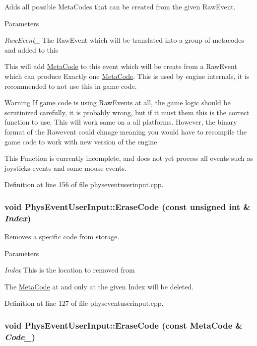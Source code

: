 Adds all possible MetaCodes that can be created from the given RawEvent. 
\begin{DoxyParams}{Parameters}
\item[{\em RawEvent\_\-}]The RawEvent which will be translated into a group of metacodes and added to this\end{DoxyParams}
This will add \hyperlink{classMetaCode}{MetaCode} to this event which will be create from a RawEvent which can produce Exactly one \hyperlink{classMetaCode}{MetaCode}. This is used by engine internals, it is recommended to not use this in game code. \begin{DoxyWarning}{Warning}
If game code is using RawEvents at all, the game logic should be scrutinized carefully, it is probably wrong, but if it must them this is the correct function to use. This will work same on a all platforms. However, the binary format of the Rawevent could chnage meaning you would have to recompile the game code to work with new version of the engine \par
 This Function is currently incomplete, and does not yet process all events such as joysticks events and some mouse events. 
\end{DoxyWarning}


Definition at line 156 of file physeventuserinput.cpp.\hypertarget{classPhysEventUserInput_a8cbbee3c2be3bd12746ad442fce526e4}{
\subsubsection[{EraseCode}]{\setlength{\rightskip}{0pt plus 5cm}void PhysEventUserInput::EraseCode (const unsigned int \& {\em Index})}}
\label{dc/d0e/classPhysEventUserInput_a8cbbee3c2be3bd12746ad442fce526e4}


Removes a specific code from storage. 
\begin{DoxyParams}{Parameters}
\item[{\em Index}]This is the location to removed from\end{DoxyParams}
The \hyperlink{classMetaCode}{MetaCode} at and only at the given Index will be deleted. 

Definition at line 127 of file physeventuserinput.cpp.\hypertarget{classPhysEventUserInput_a1dbd2996770df334fba9f67d9bb4ffa0}{
\subsubsection[{EraseCode}]{\setlength{\rightskip}{0pt plus 5cm}void PhysEventUserInput::EraseCode (const {\bf MetaCode} \& {\em Code\_\-})}}
\label{dc/d0e/classPhysEventUserInput_a1dbd2996770df334fba9f67d9bb4ffa0}


